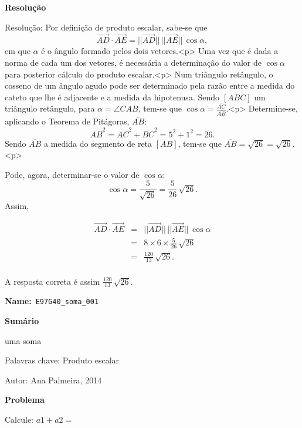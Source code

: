 \documentclass{article}
\begin{document}
\noindent\textbf{Resolução}

Resolução:
Por definição de produto escalar, sabe-se que
$$ \overrightarrow{AD} \cdot \overrightarrow{AE}=||\overrightarrow{AD}|| \, ||\overrightarrow{AE}|| \, \cos\alpha,$$
em que $\alpha$ é o ângulo formado pelos dois vetores.<p>
Uma vez que é dada a norma de cada um dos vetores, é necessária a determinação do valor de $\cos\alpha$ para posterior cálculo do produto escalar.<p>
Num triângulo retângulo, o cosseno de um ângulo agudo pode ser determinado pela razão entre a medida do cateto que lhe é adjacente e a medida da hipotenusa. Sendo $[ABC]$ um triângulo retângulo, para $\alpha=\angle CAB$, tem-se que $\displaystyle \cos \alpha =\frac{\overline{AC}}{\overline{AB}}$.<p> Determine-se, aplicando o Teorema de Pitágoras, $\overline{AB}$:
    $$\overline{AB}^2=\overline{AC}^2+\overline{BC}^2=5^2+1^2= 26.$$
Sendo $\overline{AB}$ a medida do segmento de reta $[AB]$, tem-se que $\overline{AB}=\sqrt{26}=\sqrt{26}$.<p>

Pode, agora, determinar-se o valor de $\cos\alpha$:
    $$\cos\alpha=\frac{5}{\sqrt{26}}=\frac{5}{26} \, \sqrt{26}.$$
Assim,


\begin{eqnarray*}
    \overrightarrow{AD} \cdot \overrightarrow{AE}&=& ||\overrightarrow{AD}|| \,||\overrightarrow{AE}|| \, \cos\alpha \\
                                           &=& 8 \times 6\times \frac{5}{26} \, \sqrt{26} \\
                                           &=& \frac{120}{13} \, \sqrt{26}. \\
\end{eqnarray*} 

A resposta correta é assim $\displaystyle \frac{120}{13} \, \sqrt{26}$.






\textbf{Name:}~\verb+E97G40_soma_001+

\noindent\textbf{Sumário} 



uma soma

Palavras chave: Produto escalar

Autor: Ana Palmeira, 2014




\noindent\textbf{Problema} 




Calcule: $a1 + a2 = $    
\end{document}
